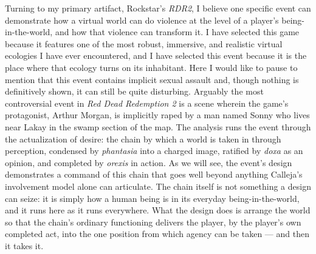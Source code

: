 \documentclass{article}
\begin{document}
Turning to my primary artifact, Rockstar's \textit{RDR2}, I believe one specific event can demonstrate how a virtual world can do violence at the level of a player's being-in-the-world, and how that violence can transform it. I have selected this game because it features one of the most robust, immersive, and realistic virtual ecologies I have ever encountered, and I have selected this event because it is the place where that ecology turns on its inhabitant. Here I would like to pause to mention that this event contains implicit sexual assault and, though nothing is definitively shown, it can still be quite disturbing. Arguably the most controversial event in \textit{Red Dead Redemption 2} is a scene wherein the game's protagonist, Arthur Morgan, is implicitly raped by a man named Sonny who lives near Lakay in the swamp section of the map. The analysis runs the event through the actualization of desire: the chain by which a world is taken in through perception, condensed by \textit{phantasia} into a charged image, ratified by \textit{doxa} as an opinion, and completed by \textit{orexis} in action. As we will see, the event's design demonstrates a command of this chain that goes well beyond anything Calleja's involvement model alone can articulate. The chain itself is not something a design can seize: it is simply how a human being is in its everyday being-in-the-world, and it runs here as it runs everywhere. What the design does is arrange the world so that the chain's ordinary functioning delivers the player, by the player's own completed act, into the one position from which agency can be taken --- and then it takes it.
\end{document}
